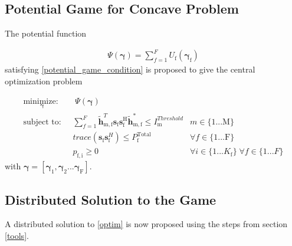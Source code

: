 \documentclass[12pt,a4paper]{report}
\begin{document}
\subsection{Potential Game for Concave Problem}

The potential function 

\begin{gather*} \label{Potential_Function}
\Psi(\mathbf{\gamma}) = \sum_{f = 1}^{F} U_{\text{f}}(\mathbf{\gamma_{\mathrm{f}}})
\end{gather*}
satisfying \eqref{potential_game_condition} is proposed to give the central optimization problem
	
		\begin{subequations}
	\label{optim}
	\begin{align}
	    \underset{\mathbf{\gamma}}{\text{minimize: }}
	    & \; \Psi(\mathbf{\gamma}) \label{potential_game} \\
	    \text{subject to: } \; &
	  \sum^F_{f=1} \mathbf{\tilde{h}}_{\mathrm{m,f}}^T  \mathbf{s}_{\mathrm{f}} 						
	\mathbf{s_{\mathrm{f}}^{\mathrm{H}}} \mathbf{\tilde{h}_{\mathrm{m,f}}^*} \leq I^{Threshold}		
	_{\mathrm{m}} & m \in \{1 ...\text{M}\} 
		\label{interference_const}\\
        & trace(\mathbf{s}_\mathrm{f}\mathbf{s}_\mathrm{f}^H)  \leq P_{\mathrm{f}}^{\text{Total}}  \label{power_const}
        & \forall f \in \{1 ... \text{F}\}\\
        & p_{\mathrm{f,i}} \geq 0 &  \forall i \in \{1 ...K_{\mathrm{f}}\} \; \forall f \in \{1 ... F\}\label{pos_power_const}
	\end{align}
	\end{subequations}
	with $\mathbf{\gamma}= [\mathbf{\gamma_{\mathrm{1}}},\mathbf{\gamma_{\mathrm{2}}}...\mathbf{\gamma_{\mathrm{F}}}]$.


\subsection{Distributed Solution to the Game}
A distributed solution to \eqref{optim} is now proposed using the steps from section \ref{tools}.
\end{document}
